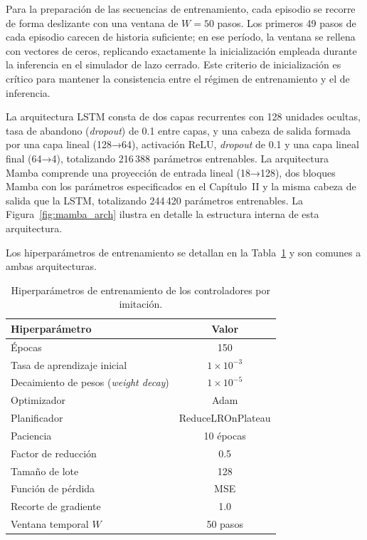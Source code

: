 Para la preparación de las secuencias de entrenamiento, cada episodio se recorre de forma deslizante con una ventana de $W=50$ pasos. Los primeros 49 pasos de cada episodio carecen de historia suficiente; en ese período, la ventana se rellena con vectores de ceros, replicando exactamente la inicialización empleada durante la inferencia en el simulador de lazo cerrado. Este criterio de inicialización es crítico para mantener la consistencia entre el régimen de entrenamiento y el de inferencia.

La arquitectura LSTM consta de dos capas recurrentes con 128 unidades ocultas, tasa de abandono (\textit{dropout}) de 0.1 entre capas, y una cabeza de salida formada por una capa lineal (128→64), activación ReLU, \textit{dropout} de 0.1 y una capa lineal final (64→4), totalizando 216\,388 parámetros entrenables. La arquitectura Mamba comprende una proyección de entrada lineal (18→128), dos bloques Mamba con los parámetros especificados en el Capítulo~II y la misma cabeza de salida que la LSTM, totalizando 244\,420 parámetros entrenables. La Figura~\ref{fig:mamba_arch} ilustra en detalle la estructura interna de esta arquitectura.



Los hiperparámetros de entrenamiento se detallan en la Tabla~\ref{tab:hiperparams_train} y son comunes a ambas arquitecturas.

\begin{table}[h]
\centering
\caption{Hiperparámetros de entrenamiento de los controladores por imitación.}
\label{tab:hiperparams_train}
\begin{tabular}{lc}
\hline
\textbf{Hiperparámetro} & \textbf{Valor} \\
\hline
Épocas & 150 \\
Tasa de aprendizaje inicial & $1 \times 10^{-3}$ \\
Decaimiento de pesos (\textit{weight decay}) & $1 \times 10^{-5}$ \\
Optimizador & Adam \\
Planificador & ReduceLROnPlateau \\
\quad Paciencia & 10 épocas \\
\quad Factor de reducción & 0.5 \\
Tamaño de lote & 128 \\
Función de pérdida & MSE \\
Recorte de gradiente & 1.0 \\
Ventana temporal $W$ & 50 pasos \\
\hline
\end{tabular}
\end{table}

